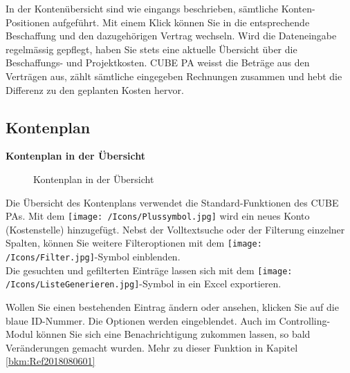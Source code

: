 In der Kontenübersicht sind wie eingangs beschrieben, sämtliche Konten-Positionen aufgeführt. Mit einem Klick können Sie in die entsprechende Beschaffung und den dazugehörigen Vertrag wechseln. Wird die Dateneingabe regelmässig gepflegt, haben Sie stets eine aktuelle Übersicht über die Beschaffungs- und Projektkosten. CUBE PA weisst die Beträge aus den Verträgen aus, zählt sämtliche eingegeben Rechnungen zusammen und hebt die Differenz zu den geplanten Kosten hervor.

\pagebreak
\subsection{Kontenplan}

\textbf{Kontenplan in der Übersicht}

\begin{figure}[H]
\caption{Kontenplan in der Übersicht}
\end{figure}

Die Übersicht des Kontenplans verwendet die Standard-Funktionen des CUBE PAs. Mit dem \texttt{[image: /Icons/Plussymbol.jpg]} wird ein neues Konto (Kostenstelle) hinzugefügt. Nebst der Volltextsuche oder der Filterung einzelner Spalten, können Sie weitere Filteroptionen mit dem \texttt{[image: /Icons/Filter.jpg]}-Symbol einblenden.\\
Die gesuchten und gefilterten Einträge lassen sich mit dem \texttt{[image: /Icons/ListeGenerieren.jpg]}-Symbol in ein Excel exportieren.

\vspace{\baselineskip}

Wollen Sie einen bestehenden Eintrag ändern oder ansehen, klicken Sie auf die blaue ID-Nummer. Die Optionen werden eingeblendet. Auch im Controlling-Modul können Sie sich eine Benachrichtigung zukommen lassen, so bald Veränderungen gemacht wurden. Mehr zu dieser Funktion in Kapitel \ref{bkm:Ref2018080601}


